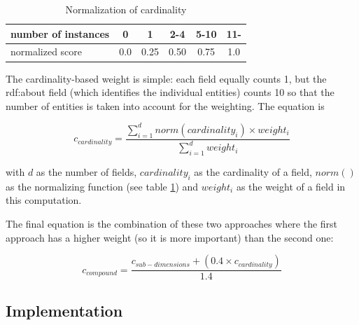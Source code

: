 \begin{table}
\caption{Normalization of cardinality}
\label{table:normalization}
\centering
\begin{tabular}{l|c|c|c|c|c}
number of instances & 0 & 1 & 2-4 & 5-10 & 11- \\
\hline
normalized score & 0.0 & 0.25 & 0.50 & 0.75 & 1.0 \\
\end{tabular}
\end{table}

The cardinality-based weight is simple: each field equally counts 1, but the rdf:about field (which identifies the individual entities) counts 10 so that the number of entities is taken into account for the weighting. The equation is

\begin{equation}
c_{cardinality} = \frac{\sum\limits_{i=1}^{d} norm(cardinality_i) \times weight_i}{\sum\limits_{i=1}^{d} weight_i}
\end{equation}

with $d$ as the number of fields, $cardinality_{i}$ as the cardinality of a field, $norm()$ as the normalizing function (see table \ref{table:normalization}) and $weight_i$ as the weight of a field in this computation.

The final equation is the combination of these two approaches where the first approach has a higher weight (so it is more important) than the second one:

\begin{equation}
c_{compound} = \frac{c_{sub-dimensions} + (0.4 \times c_{cardinality})}{1.4}
\end{equation}

\subsection{Implementation}

